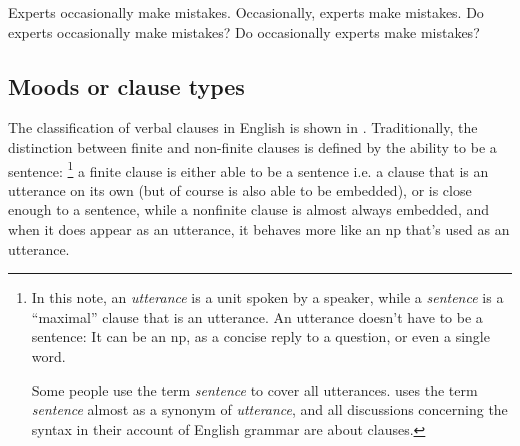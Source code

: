 \documentclass[UTF8, a4paper, oneside, scheme=plain, 12pt]{ctexbook}
\newcommand*{\citepage}[1]{p.~{#1}}
\newcommand*{\term}[1]{\emph{#1}}
\begin{document}
\begin{exe}
    \ex Experts occasionally make mistakes.
    \ex Occasionally, experts make mistakes.
    \ex Do experts occasionally make mistakes?
    \ex *Do occasionally experts make mistakes?
\end{exe}

\subsection{Moods or clause types}\label{sec:moods}

The classification of verbal clauses in English is shown in .
Traditionally, the distinction between finite and non-finite clauses 
is defined by the ability to be a sentence:%
\footnote{
    In this note, an \term{utterance} is a unit spoken by a speaker,
    while a \term{sentence} is a ``maximal'' clause that is an utterance.
    An utterance doesn't have to be a sentence:
    It can be an \acs{np}, as a concise reply to a question,
    or even a single word.

    Some people use the term \term{sentence} to cover all utterances.
    \citet[\citepage{45}, \citepage{853}]{cgel} uses the term \term{sentence} 
    almost as a synonym of \term{utterance},
    and all discussions concerning the syntax in their account of English grammar are about clauses.
} 
a finite clause is either able to be a sentence i.e. a clause that is an utterance on its own
(but of course is also able to be embedded),
or is close enough to a sentence,
while a nonfinite clause is almost always embedded,
and when it does appear as an utterance,
it behaves more like an \acs{np} that's used as an utterance.
\end{document}

